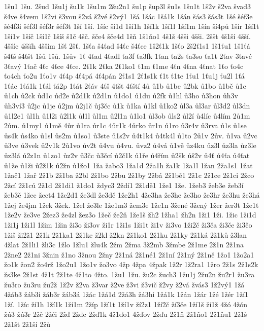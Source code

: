 1šu1
1šu.
2šud
1šu1j
šu1k
1šu1m
2šu2n1
šu1p
šup3l
šu1s
1šu1t
1š2v
š2va
švad3
š4ve
š4vem
1š2vi
š3vou
š2vá
š2vé
š2vý1
1šá
1šác
1šá1k
1šán
šás3
šás3t
1šé
šéf3e
šé4f3i
šéf3l
šéf3r
šéf3t
1ší
1ší.
1šíc
ší1d
1ší1h
1ší1k
1ší1l
1ší1m
1šín
ší4pů
1šír
1ší1t
1ší1v
1šíč
1ší1ř
1šíš
š1č
4šč.
šče4
šče4d
1šň
1š1ňo1
4š1š
4šši
4šši.
2ššt
4š1ší
4šší.
4ššíc
4ššíh
4šším
1šť
2šť.
1šťa
š4ťad
š4ťc
š4ťce
1š2ť1k
1šťo
2š2ť1s1
1š1ťu1
1š1ťá
š4ťš
š4ťšt
1šů
1šů.
1šův
1ť
4ťad
4ťadl
ťa3f
ťa3fk
1ťan
ťa2s
ťa3so
ťa1t
2ťav
3ťavé
3ťavý
1ťač
4ťc
4ťce
4ťce.
2ť1k
2ťka
2ť1ko1
ť1m
ť1me
4ťn
4ťna
4ťnat
1ťo
ťo4c
ťo4ch
ťo2u
1ťo1v
4ť4p
4ť4pá
4ť4pán
2ť1s1
2ť1s1k
ť1t
ť1te
1ťu1
1ťu1j
ťu2l
1ťá
1ťác
1ťá1k
1ťál
ťá2p
1ťát
2ťáv
4ťš
4ťšt
4ťští
4ů
ů1b
ů1be
ů2bk
ů1bo
ů1bě
ů1c
ů1ch
ů2ck
ůd1c
ůd2e
ů2d1k
ů2d1n
ů1do1
ů1du
ů2fk
ů1hl
ů3ho
ů3hon
ůh3v
ůh3ví3
ů2jc
ů1je
ů2jm
ů2j1č
ůj3čc
ů1k
ů1ka
ů1kl
ů1ko2
ůl3a
ůl3ar
ůl3d2
ůl3dn
ů1l2e1
ůl1h
ů1l2i
ů2l1k
ůl1l
ůl1m
ů2l1n
ů1lo1
ůl3ob
ůls2
ůl2í
ů4líc
ů4lím
2ů1m
2ům.
ů1my1
ů1mě
4ůr
ů1ra
ůr1c
4ůr1k
4ůrko
ůr1n
ů1ro
ů3r4v
ů3rva
ů1s
ů1se
ůs4k
ůs4ko
ů1sl
ůs2m
ů1so1
ů3ste
ů1s2v
ů4t1k4
ů4tk4l
ů1to
2ů1v
2ův.
ů1va
ů2vc
ů3ve
ů3vek
ů2v1k
2ů1vo
ův2t
ů4vu
ů4vu.
ůvz2
ů4vá
ů1vě
ůz4ku
ůz3l
ůz3la
ůz3le
ůz3lá
ů2z1n
ů1zo1
ůz2v
ů3čc
ů3čcí
ů2č1k
ů1ře
ů4řím
ů2šk
ůš2v
ů4ť
ů4ťa
ů4ťat
ů1že
ů1ži
ů2ž1k
ů2žn
ů1žo1
1ža
žabo3
1ža1d
2ža1h
ža1k
1ža1l
1žan
2ža1s1
1žat
1žač1
1žař
2ž1b
2ž1ba
ž2bl
2ž1bo
2žbu
2ž1by
2žbá
2ž1bě1
2ž1c
2ž1ce
2ž1ci
2žco
2žcí
2ž1ců
2ž1d
2ž1di1
ž1do1
ždyc3
2ždí1
2ž1dě1
1že1
1že.
1žeb3
žeb3e
žeb3í
žeb3ě
1žec
žect4
1že2d1
že3dl
že3dě
1že2h1
4že3ha
že3he
že3ho
že3hr
že3hu
že3há
1žej
že4jm
1žek
3žek.
1žel
že3le
1že1m3
žem3e
1že1n
3žené
3žený
1žer
žer3t
1že1t
1že2v
že3ve
2žez3
že4zl
žez3o
1žeč
že2ň
1že1š
žh2
1žha1
žh2n
1ži1
1ži.
1žic
1ži1d
1ži1j
1ži1l
1žim
1žin
ži3o
ži3ov
ži1r
1ži1s
1ži1t
ži1v
ži3vo
1ži2č
ži3ča
ži3če
ži3čo
1žiš
ži2ž1
2ž1k
2ž1ka1
2ž1ke
ž2kl
ž2kn
2ž1ko1
2ž1ku
2ž1ky
2ž1ká
2ž1ků
ž3lan
4žlat
2ž1li1
žli3c
1žlo
1žlu1
žlu4k
2žm
2žma
3ž2mb
3žmbe
2ž1me
2ž1n
2ž1na
2žne2
2ž1ni
3žnin
ž1no
3žnou
2žny
2ž1ná
2ž1né1
2ž1ní
2ž1ný
2ž1ně
1žo1
1žo2a1
žo1k
žon2
žo4rž
1žo2u1
1žo1v
žo3vo
4žp
4žpa
4žpak
1ž2r
1ž2ra1
1žro
2ž1s
2ž1s2k
žs3ke
2ž1st
4ž1t
2ž1te
4ž1to
4žto.
1žu1
1žu.
žu2c
žuch3
1žu1j
2žu2n
žu2r1
žu3ra
žu3ro
žu3ru
žu2ž
1ž2v
ž2va
ž3var
ž2ve
ž3vi
ž3vič
ž2vy
ž2vá
žvás3
1ž2vý1
1žá
4žáb3
žáb3i
žáb3r
žáb3á
1žác
1žá1d
2žá3h
žá3hi
1žá1k
1žán
1žár
1žé
1žér
1ží1
1ží.
1žíc
ží1h
1ží1k
1ží1m
2žíp
1ží1t
1ží1v
ží2z1
1ží2č
ží3če
1ží1š
ží1ž
4žó
4žón
žú3
žú3r
2žč
2žči
2žď
2žďc
2žď1k
4ž1ďo1
4žďov
2žďu
2ž1ň
2ž1ňo1
2ž1ňu1
2ž1š
2ž1št
2ž1ší
2žů
